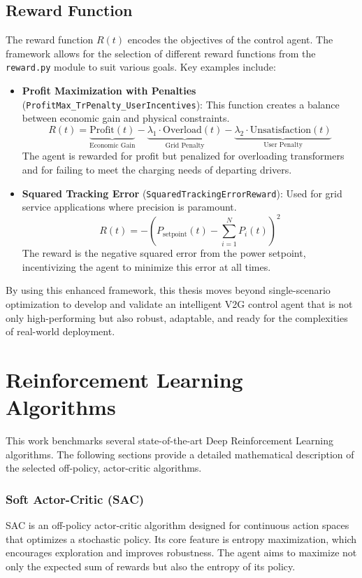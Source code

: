 \subsection{Reward Function}
The reward function $R(t)$ encodes the objectives of the control agent. The framework allows for the selection of different reward functions from the \texttt{reward.py} module to suit various goals. Key examples include:
\begin{itemize}
    \item \textbf{Profit Maximization with Penalties} (\texttt{ProfitMax\_TrPenalty\_UserIncentives}): This function creates a balance between economic gain and physical constraints.
    \[
    R(t) = \underbrace{\text{Profit}(t)}_{\text{Economic Gain}} - \underbrace{\lambda_1 \cdot \text{Overload}(t)}_{\text{Grid Penalty}} - \underbrace{\lambda_2 \cdot \text{Unsatisfaction}(t)}_{\text{User Penalty}}
    \]
    The agent is rewarded for profit but penalized for overloading transformers and for failing to meet the charging needs of departing drivers.
    
    \item \textbf{Squared Tracking Error} (\texttt{SquaredTrackingErrorReward}): Used for grid service applications where precision is paramount.
    \[
    R(t) = - \left( P_{\text{setpoint}}(t) - \sum_{i=1}^N P_i(t) \right)^2
    \]
    The reward is the negative squared error from the power setpoint, incentivizing the agent to minimize this error at all times.
\end{itemize}

By using this enhanced framework, this thesis moves beyond single-scenario optimization to develop and validate an intelligent V2G control agent that is not only high-performing but also robust, adaptable, and ready for the complexities of real-world deployment.

\section{Reinforcement Learning Algorithms}
This work benchmarks several state-of-the-art Deep Reinforcement Learning algorithms. The following sections provide a detailed mathematical description of the selected off-policy, actor-critic algorithms.

\subsubsection{Soft Actor-Critic (SAC)}
SAC is an off-policy actor-critic algorithm designed for continuous action spaces that optimizes a stochastic policy. Its core feature is entropy maximization, which encourages exploration and improves robustness. The agent aims to maximize not only the expected sum of rewards but also the entropy of its policy.

